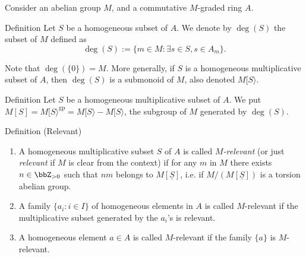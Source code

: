 \documentclass[9pt]{beamer}
\begin{document}
\begin{frame}


Consider an abelian group $M$, and a commutative $M$-graded ring $A$. 

 \begin{block}{Definition}
 Let $S$ be a homogeneous subset of $A$. We denote by $\deg(S)$ the subset of $M$ defined as 
\[\deg(S):= \{ m \in M : \exists s \in S , s  \in A_m \}. \]
 \end{block} 
Note that $\deg(\{0\})=M$.
More generally, if $S$ is a homogeneous multiplicative subset of $A$, then $\deg(S)$ is a submonoid of $M$, also denoted $M[S\rangle$.

\begin{block}{Definition}
Let $S$ be a homogeneous multiplicative subset of $A$. 
 We put $M[S]=M[S \rangle^{\mathrm{gp}}= M[S \rangle- M[S \rangle$, the subgroup of $M$ generated by $\deg(S)$.

\end{block}


\begin{block}{Definition (Relevant)}
\begin{enumerate} \item 
 A homogeneous multiplicative subset $S$ of $A$ is called \emph{$M$-relevant} (or just \emph{relevant} if $M$ is clear from the context) if for any $m$ in $M$ there exists $n \in \bbZ_{> 0}$ such that $nm$ belongs to $M[\underline{S}]$, i.e. if $M/(M[\underline{S}])$ is a torsion abelian group.

 \item
 A family $\{a_i : i \in I\}$ of homogeneous elements in $A$ is called $M$-relevant if the multiplicative subset generated by the $a_i$'s is relevant.
 \item
 A homogeneous element $a \in A$ is called $M$-relevant if the family $\{a\}$ is $M$-relevant.
\end{enumerate}\end{block}

\end{frame}
\end{document}
